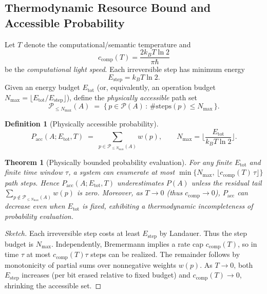 \documentclass{article}
\newtheorem{theorem}{Theorem}
\newtheorem{definition}{Definition}
\begin{document}
\subsection{Thermodynamic Resource Bound and Accessible Probability}
\label{subsec:thermo-bound}
Let $T$ denote the computational/semantic temperature and
\begin{equation}
c_{\mathrm{comp}}(T)=\frac{2k_B T\ln 2}{\pi\hbar}
\label{eq:ccomp}
\end{equation}
be the \emph{computational light speed}. Each irreversible step has minimum energy
\begin{equation}
E_{\mathrm{step}}=k_B T\ln 2.
\label{eq:landauer-step}
\end{equation}
Given an energy budget $E_{\mathrm{tot}}$ (or, equivalently, an operation budget
$N_{\max}=\lfloor E_{\mathrm{tot}}/E_{\mathrm{step}}\rfloor$), define the \emph{physically accessible} path set
\[
\mathcal{P}_{\le N_{\max}}(A) \;=\; \{\,p\in\mathcal{P}(A)\,:\, \#\mathrm{steps}(p)\le N_{\max}\,\}.
\]
\begin{definition}[Physically accessible probability]
\label{def:accessible-prob}
\begin{equation}
P_{\mathrm{acc}}(A;E_{\mathrm{tot}},T)
\;=\;
\sum_{p\in\mathcal{P}_{\le N_{\max}}(A)} w(p),
\qquad
N_{\max}=\Big\lfloor \frac{E_{\mathrm{tot}}}{k_B T\ln 2}\Big\rfloor.
\label{eq:Pacc}
\end{equation}
\end{definition}
\begin{theorem}[Physically bounded probability evaluation]
\label{thm:phys-bounded-prob}
For any finite $E_{\mathrm{tot}}$ and finite time window $\tau$, a system can enumerate
at most $\min\!\big\{N_{\max},\,\lfloor c_{\mathrm{comp}}(T)\,\tau\rfloor\big\}$ path steps.
Hence $P_{\mathrm{acc}}(A;E_{\mathrm{tot}},T)$ underestimates $P(A)$ unless the residual tail
$\sum_{p\notin\mathcal{P}_{\le N_{\max}}(A)} w(p)$ is zero. Moreover, as $T\!\to\!0$ (thus $c_{\mathrm{comp}}\!\to\!0$),
$P_{\mathrm{acc}}$ can decrease even when $E_{\mathrm{tot}}$ is fixed, exhibiting a thermodynamic
incompleteness of probability evaluation.
\end{theorem}
\begin{proof}[Sketch]
Each irreversible step costs at least $E_{\mathrm{step}}$ by Landauer.
Thus the step budget is $N_{\max}$. Independently, Bremermann implies a rate cap $c_{\mathrm{comp}}(T)$,
so in time $\tau$ at most $c_{\mathrm{comp}}(T)\tau$ steps can be realized. The remainder follows by monotonicity
of partial sums over nonnegative weights $w(p)$. As $T\!\to\!0$, both $E_{\mathrm{step}}$ increases
(per bit erased relative to fixed budget) and $c_{\mathrm{comp}}(T)\to 0$, shrinking the accessible set.
\end{proof}
\end{document}
